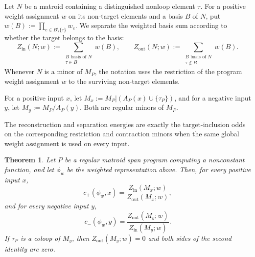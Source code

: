 \documentclass[11pt]{article}
\numberwithin{equation}{section}
\newtheorem{theorem}[definition]{Theorem}
\theoremstyle{remark}
\begin{document}
Let $N$ be a matroid containing a
distinguished nonloop element $\tau$. For a positive weight assignment $w$
on its non-target elements and a basis $B$ of $N$, put $w(B):=\prod_{e\in B\setminus\{\tau\}}w_e$.
We separate the weighted basis sum according to whether the target belongs to
the basis:
\begin{equation}
    Z_{\mathrm{in}}(N;w)
    :=
    \sum_{\substack{B\text{ basis of }N\\ \tau\in B}}w(B),
    \qquad
    Z_{\mathrm{out}}(N;w)
    :=
    \sum_{\substack{B\text{ basis of }N\\ \tau\notin B}}w(B).
\end{equation}
Whenever $N$ is a minor of $M_P$, the notation uses the restriction of the
program weight assignment $w$ to the surviving non-target elements.

For a positive input $x$, let $M_x:=M_P|(A_P(x)\cup\{\tau_P\})$, and for a negative input $y$, let $M_y:=M_P/A_P(y)$. Both are regular minors of $M_P$.

The reconstruction and separation energies are exactly the target-inclusion
odds on the corresponding restriction and contraction minors when the same
global weight assignment is used on every input.

\begin{theorem}
\label{thm:regular-matroid-energy}
Let $P$ be a regular matroid span program computing a nonconstant function,
and let $\phi_w$ be the weighted representation above. Then, for every
positive input $x$,
\begin{equation}
    c_+(\phi_w,x)
    =
    \frac{Z_{\mathrm{in}}(M_x;w)}
         {Z_{\mathrm{out}}(M_x;w)},
\end{equation}
and for every negative input $y$,
\begin{equation}
    c_-(\phi_w,y)
    =
    \frac{Z_{\mathrm{out}}(M_y;w)}
         {Z_{\mathrm{in}}(M_y;w)}.
\end{equation}
If $\tau_P$ is a coloop of $M_y$, then
$Z_{\mathrm{out}}(M_y;w)=0$ and both sides of the second identity are zero.
\end{theorem}
\end{document}
